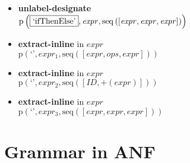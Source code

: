 {\begin{itemize}
\item \textbf{unlabel-designate}\\$\mathrm{p}\left(\fbox{\text{`ifThenElse'}},\mathit{expr},\mathrm{seq}\left(\left[\mathit{expr}, \mathit{expr}, \mathit{expr}\right]\right)\right)$
\item \textbf{extract-inline}  in $\mathit{expr}$\\$\mathrm{p}\left(\text{`'},\mathit{expr_1},\mathrm{seq}\left(\left[\mathit{expr}, \mathit{ops}, \mathit{expr}\right]\right)\right)$
\item \textbf{extract-inline}  in $\mathit{expr}$\\$\mathrm{p}\left(\text{`'},\mathit{expr_2},\mathrm{seq}\left(\left[\mathit{ID}, \plus \left(\mathit{expr}\right)\right]\right)\right)$
\item \textbf{extract-inline}  in $\mathit{expr}$\\$\mathrm{p}\left(\text{`'},\mathit{expr_3},\mathrm{seq}\left(\left[\mathit{expr}, \mathit{expr}, \mathit{expr}\right]\right)\right)$
\end{itemize}}

\section{Grammar in ANF}

